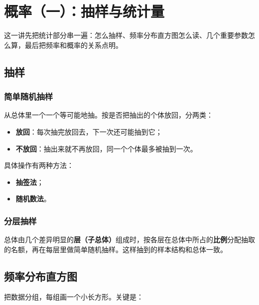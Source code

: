 \chapter{概率（一）：抽样与统计量}

这一讲先把统计部分串一遍：怎么抽样、频率分布直方图怎么读、几个重要参数怎么算，最后把频率和概率的关系点明。

\section{抽样}

\subsection*{简单随机抽样}

从总体里一个一个等可能地抽。按是否把抽出的个体放回，分两类：

\begin{itemize}
    \item \textbf{放回}：每次抽完放回去，下一次还可能抽到它；
    \item \textbf{不放回}：抽出来就不再放回，同一个个体最多被抽到一次。
\end{itemize}

具体操作有两种方法：

\begin{itemize}
    \item \textbf{抽签法}；
    \item \textbf{随机数法}。
\end{itemize}

\subsection*{分层抽样}

总体由几个差异明显的\textbf{层（子总体）}组成时，按各层在总体中所占的\textbf{比例}分配抽取的名额，再在每层里做简单随机抽样。这样抽到的样本结构和总体一致。

\section{频率分布直方图}

把数据分组，每组画一个小长方形。关键是：


